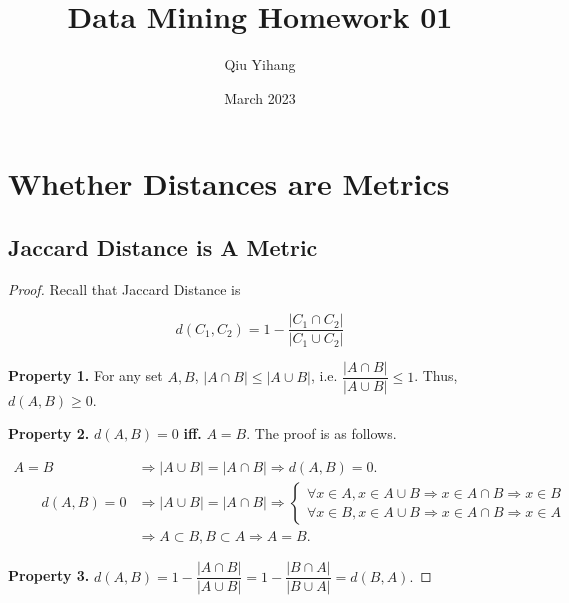 \documentclass{article}
\title{\textbf{Data Mining Homework 01}}
\author{Qiu Yihang}
\date{March 2023}
\begin{document}
\maketitle

\vspace{1em}
\section{Whether Distances are Metrics}
\vspace{1em}
\subsection{Jaccard Distance is A Metric}
\vspace{1em}
\begin{proof}

    Recall that Jaccard Distance is 

    \vspace{-0.75em}
    $$d(C_1,C_2)=1-\dfrac{|C_1\cap C_2|}{|C_1\cup C_2|}$$

    \hspace{1.3em}
    \textbf{Property 1.} For any set $A,B$, $|A\cap B|\le|A\cup B|$, i.e. $\dfrac{|A\cap B|}{|A\cup B|}\le 1$. Thus, $d(A,B)\geq0.$

    \vspace{1em} \hspace{1.3em}
    \textbf{Property 2.} $d(A,B)=0$ \textbf{iff.} $A=B$. The proof is as follows.

    \vspace{-3em}
    \begin{align*}
        A=B &\Longrightarrow |A\cup B|=|A\cap B| \Longrightarrow d(A,B)=0. \\
        \qquad d(A,B)=0 &\Longrightarrow |A\cup B|=|A\cap B| \Longrightarrow \left\{\begin{array}{l}
            \forall x\in A, x\in A\cup B\Rightarrow x\in A\cap B \Rightarrow x\in B \\
            \forall x\in B, x\in A\cup B\Rightarrow x\in A\cap B \Rightarrow x\in A
        \end{array}\right. \\
        &\Longrightarrow A\subset B, B\subset A\Longrightarrow A=B.
    \end{align*}

    \hspace{1.3em}
    \textbf{Property 3.} $d(A,B)=1-\dfrac{|A\cap B|}{|A\cup B|} = 1-\dfrac{|B\cap A|}{|B\cup A|}=d(B,A).$


\end{proof}
\end{document}
